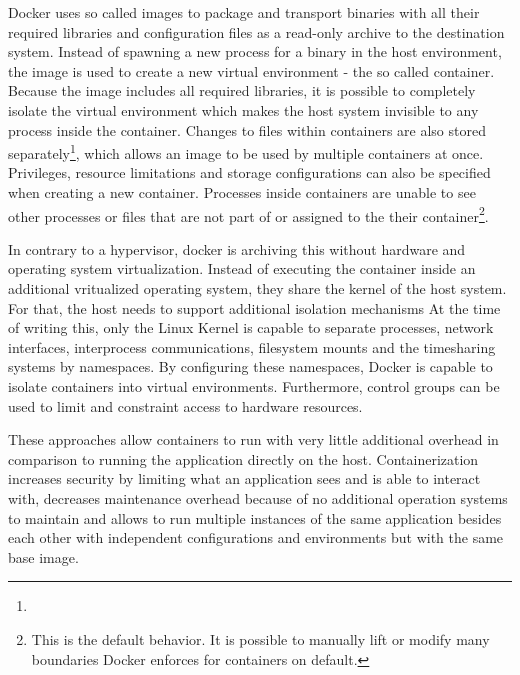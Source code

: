 Docker uses so called images to package and transport binaries with all their required libraries and configuration files as a read-only archive to the destination system.
Instead of spawning a new process for a binary in the host environment, the image is used to create a new virtual environment - the so called container.
Because the image includes all required libraries, it is possible to completely isolate the virtual environment which makes the host system invisible to any process inside the container.
Changes to files within containers are also stored separately\footnote{}, which allows an image to be used by multiple containers at once.
Privileges, resource limitations and storage configurations can also be specified when creating a new container.
Processes inside containers are unable to see  other processes or files that are not part of or assigned to the their container\footnote{This is the default behavior. It is possible to manually lift or modify many boundaries Docker enforces for containers on default.}.

In contrary to a hypervisor, docker is archiving this without hardware and operating system virtualization.
Instead of executing the container inside an additional vritualized operating system, they share the kernel of the host system.
For that, the host needs to support additional isolation mechanisms
At the time of writing this, only the Linux Kernel is capable to separate processes, network interfaces, interprocess communications, filesystem mounts and the timesharing systems by namespaces.
By configuring these namespaces, Docker is capable to isolate containers into virtual environments.
Furthermore, control groups can be used to limit and constraint access to hardware resources.
\cite{docker:overview}

These approaches allow containers to run with very little additional overhead in comparison to running the application directly on the host.
Containerization increases security by limiting what an application sees and is able to interact with, decreases maintenance overhead because of no additional operation systems to maintain and allows to run multiple instances of the same application besides each other with independent configurations and environments but with the same base image.

